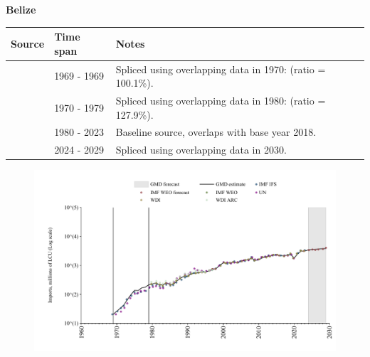 \documentclass[12pt,a4paper,landscape]{article}
\begin{document}
\begin{adjustbox}{max totalsize={\paperwidth}{\paperheight},center}
\begin{minipage}[t][\textheight][t]{\textwidth}
\vspace*{0.5cm}
{}
\begin{center}
{\Large\bfseries Belize}
\end{center}
\vspace{0.5cm}
\begin{table}[H]
\centering
\small
\begin{tabular}{|l|l|l|}
\hline
\textbf{Source} & \textbf{Time span} & \textbf{Notes} \\
\hline
\rowcolor{white}\cite{IMF_IFS}& 1969 - 1969 &Spliced using overlapping data in 1970: (ratio = 100.1\%).\\
\rowcolor{lightgray}\cite{UN}& 1970 - 1979 &Spliced using overlapping data in 1980: (ratio = 127.9\%).\\
\rowcolor{white}\cite{WDI}& 1980 - 2023 &Baseline source, overlaps with base year 2018.\\
\rowcolor{lightgray}\cite{IMF_WEO_forecast}& 2024 - 2029 &Spliced using overlapping data in 2030.\\
\hline
\end{tabular}
\end{table}
\begin{figure}[H]
\centering
\includegraphics[width=\textwidth,height=0.6\textheight,keepaspectratio]{graphs/BLZ_imports.pdf}
\end{figure}
\end{minipage}
\end{adjustbox}
\end{document}
